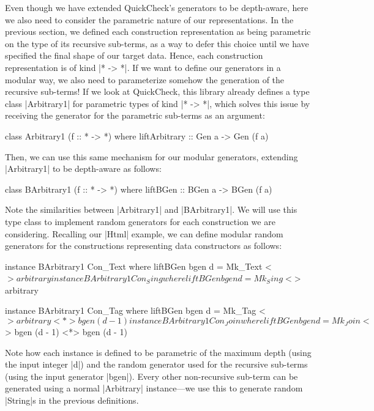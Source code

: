 Even though we have extended QuickCheck's generators to be depth-aware, here we
also need to consider the parametric nature of our representations.
%
In the previous section, we defined each construction representation as being
parametric on the type of its recursive sub-terms, as a way to defer this choice
until we have specified the final shape of our target data.
%
Hence, each construction representation is of kind |* -> *|.
%
If we want to define our generators in a modular way, we also need to
parameterize somehow the generation of the recursive sub-terms!
%
If we look at QuickCheck, this library already defines a type class |Arbitrary1|
for parametric types of kind |* -> *|, which solves this issue by receiving the
generator for the parametric sub-terms as an argument:

\begin{code}
class Arbitrary1 (f :: * -> *) where
  liftArbitrary :: Gen a -> Gen (f a)
\end{code}
%
%
%
%
Then, we can use this same mechanism for our modular generators, extending
|Arbitrary1| to be depth-aware as follows:

\begin{code}
class BArbitrary1 (f :: * -> *) where
  liftBGen :: BGen a -> BGen (f a)
\end{code}
%
Note the similarities between |Arbitrary1| and |BArbitrary1|.
%
We will use this type class to implement random generators for each construction
we are considering.
%
Recalling our |Html| example, we can define modular random generators for the
constructions representing data constructors as follows:

\begin{code}
instance BArbitrary1 Con_Text where
  liftBGen bgen d = Mk_Text <$> arbitrary

instance BArbitrary1 Con_Sing where
  liftBGen bgen d = Mk_Sing <$> arbitrary

instance BArbitrary1 Con_Tag where
  liftBGen bgen d = Mk_Tag <$> arbitrary <*> bgen (d - 1)

instance BArbitrary1 Con_Join where
  liftBGen bgen d = Mk_Join <$> bgen (d - 1) <*> bgen (d - 1)
\end{code} %
%
Note how each instance is defined to be parametric of the maximum depth (using
the input integer |d|) and the random generator used for the recursive sub-terms
(using the input generator |bgen|).
%
Every other non-recursive sub-term can be generated using a normal |Arbitrary|
instance---we use this to generate random |String|s in the previous definitions.


